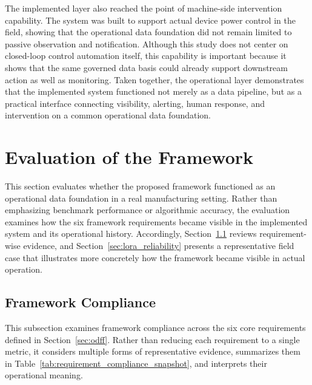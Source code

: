 \documentclass[systems,article,submit,pdftex,moreauthors]{Definitions/mdpi}
\begin{document}
The implemented layer also reached the point of machine-side intervention capability. The system was built to support actual device power control in the field, showing that the operational data foundation did not remain limited to passive observation and notification. Although this study does not center on closed-loop control automation itself, this capability is important because it shows that the same governed data basis could already support downstream action as well as monitoring. Taken together, the operational layer demonstrates that the implemented system functioned not merely as a data pipeline, but as a practical interface connecting visibility, alerting, human response, and intervention on a common operational data foundation.



\section{Evaluation of the Framework}
\label{sec:framework_evaluation}

This section evaluates whether the proposed framework functioned as an operational data foundation in a real manufacturing setting. Rather than emphasizing benchmark performance or algorithmic accuracy, the evaluation examines how the six framework requirements became visible in the implemented system and its operational history. Accordingly, Section~\ref{sec:framework_compliance} reviews requirement-wise evidence, and Section~\ref{sec:lora_reliability} presents a representative field case that illustrates more concretely how the framework became visible in actual operation.


\subsection{Framework Compliance}
\label{sec:framework_compliance}

This subsection examines framework compliance across the six core requirements defined in Section~\ref{sec:odff}. Rather than reducing each requirement to a single metric, it considers multiple forms of representative evidence, summarizes them in Table~\ref{tab:requirement_compliance_snapshot}, and interprets their operational meaning.
\end{document}
